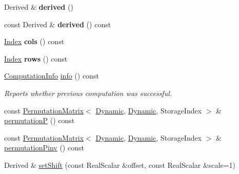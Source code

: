 \begin{DoxyCompactItemize}
\mbox{\label{group___sparse_cholesky___module_a1b7c0264498027c7ef5137b5e6f9d91f}} 
Derived \& {\bfseries derived} ()
\item 
\mbox{\label{group___sparse_cholesky___module_ab711e243888c29902afba59faee258ff}} 
const Derived \& {\bfseries derived} () const
\item 
\mbox{\label{group___sparse_cholesky___module_aa494e6ff5a27911c1f8c1fb27a56ff1a}} 
\hyperlink{namespace_eigen_a62e77e0933482dafde8fe197d9a2cfde}{Index} {\bfseries cols} () const
\item 
\mbox{\label{group___sparse_cholesky___module_aafce8db4ee2d23ecf8888260d7c8b187}} 
\hyperlink{namespace_eigen_a62e77e0933482dafde8fe197d9a2cfde}{Index} {\bfseries rows} () const
\item 
\hyperlink{group__enums_ga85fad7b87587764e5cf6b513a9e0ee5e}{Computation\+Info} \hyperlink{group___sparse_cholesky___module_a3ac877f73aaaff670e6ae7554eb02fc8}{info} () const
\begin{DoxyCompactList}\small\item\em Reports whether previous computation was successful. \end{DoxyCompactList}\item 
const \hyperlink{group___core___module_class_eigen_1_1_permutation_matrix}{Permutation\+Matrix}$<$ \hyperlink{namespace_eigen_ad81fa7195215a0ce30017dfac309f0b2}{Dynamic}, \hyperlink{namespace_eigen_ad81fa7195215a0ce30017dfac309f0b2}{Dynamic}, Storage\+Index $>$ \& \hyperlink{group___sparse_cholesky___module_aff1480e595a21726beaec9a586a94d5a}{permutationP} () const
\item 
const \hyperlink{group___core___module_class_eigen_1_1_permutation_matrix}{Permutation\+Matrix}$<$ \hyperlink{namespace_eigen_ad81fa7195215a0ce30017dfac309f0b2}{Dynamic}, \hyperlink{namespace_eigen_ad81fa7195215a0ce30017dfac309f0b2}{Dynamic}, Storage\+Index $>$ \& \hyperlink{group___sparse_cholesky___module_a0e23d1f4a88c211be7098faf1cb41674}{permutation\+Pinv} () const
\item 
Derived \& \hyperlink{group___sparse_cholesky___module_a362352f755101faaac59c1ed9d5e3559}{set\+Shift} (const Real\+Scalar \&offset, const Real\+Scalar \&scale=1)
\item 

\end{DoxyCompactItemize}

